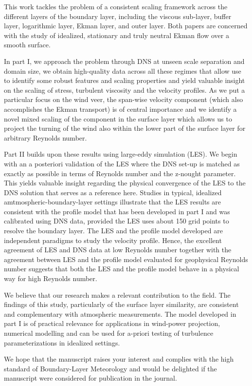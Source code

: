 \documentclass[brief]{fub}
\begin{document}
%
This work tackles the problem of a consistent scaling framework across the different layers of the boundary layer,
including the viscous sub-layer, buffer layer, logarithmic layer, Ekman layer, and outer layer. Both papers 
are concerned with the study of idealized, stationary and truly neutral Ekman flow over a smooth surface. 
%
\par
%
In part I, we approach the problem through DNS at unseen scale separation and domain size, we obtain high-quality data across all
these regimes that allow use to identify some robust features and scaling properties and yield valuable insight
on the scaling of stress, turbulent viscosity and the velocity profiles.
%
As we put a particular focus on the wind veer, the span-wise velocity component (which also accomplishes the Ekman transport)
is of central importance and we identify a novel mixed scaling of the component in the surface layer which allows us
to project the turning of the wind also within the lower part of the surface layer for arbitrary Reynolds number.
% 
\par
%
Part II builds upon these results using large-eddy simulation (LES). We begin with an a posteriori validation of the LES where
the DNS set-up is matched as exactly as possible in terms of Reynolds number and the z-nought parameter.
This yields valuable insight regarding the physical convergence of the LES to the DNS solution that serves as a reference here. 
%
Studies in typical, idealized amtmospheric-boundary-layer settings illustrate that the LES results are consistent with
the profile model that has been developed in part I and was calibrated using DNS data, provided the LES uses about 150 grid points to resolve the boundary layer.
%
The LES and the profile model developed are independent paradigms to study the velocity profile. Hence, the excellent agreement of LES and DNS data at low Reynolds number together with the agreement between LES and the profile model evaluated for geophysical Reynolds number suggests that both the LES and the profile model behave in a physical way for high Reynolds number. 
%
\par
%
We believe that our research makes a relevant contribution to the field.
%
The findings of this study, particularly of the surface layer similarity, are consistent and
complementary with atmospheric measurements.
%
The model developed in part I is of practical relevance for applications in wind-power projection, numerical modelling
and can be used for a-priori testing of turbulence parameterizations in idealized settings. 
%
\par
%
We hope that the manuscript raises your interest and complies with the high standard of Boun\-da\-ry-Layer Meteorology and  would be delighted if the manuscript were considered for publication in the journal.
\end{document}
